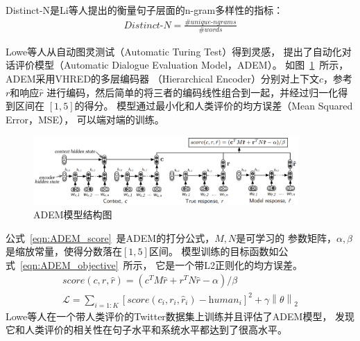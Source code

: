 Distinct-N是Li等人提出的衡量句子层面的n-gram多样性的指标：
\begin{align}
    \textit{Distinct-N} = \frac{\#\textit{unique-ngrams}}{\#\textit{words}}
\end{align}

Lowe等人从自动图灵测试（Automatic Turing Test）得到灵感，
提出了自动化对话评价模型（Automatic Dialogue Evaluation Model，ADEM）。
如图~\ref{fig:ADEM_model}~所示，ADEM采用VHRED的多层编码器
（Hierarchical Encoder）分别对上下文$c$，参考$r$和响应$\hat{r}$
进行编码，然后简单的将三者的编码线性组合到一起，并经过归一化得到区间在
$[1, 5]$的得分。
模型通过最小化和人类评价的均方误差（Mean Squared Error，MSE），
可以端对端的训练。
\begin{figure}[H]
    \centering
    \includegraphics[width=0.9\textwidth]{figure/ADEM.pdf}
    \caption{ADEM模型结构图}
    \label{fig:ADEM_model}
\end{figure}

公式~\ref{eqn:ADEM_score}~是ADEM的打分公式，$M, N$是可学习的
参数矩阵，$\alpha, \beta$是缩放常量，使得分数落在$[1, 5]$区间。
模型训练的目标函数如公式~\ref{eqn:ADEM_objective}~所示，
它是一个带L2正则化的均方误差。
\begin{align}
    \textit{score}(c, r, \hat{r}) = (c^T M \hat{r} + r^T N \hat{r} - \alpha) / \beta
    \label{eqn:ADEM_score} \\
    \mathcal{L} = \sum_{i=1:K} [\textit{score}(c_i, r_i, \hat{r}_i) - \textit{human}_i]^2 + \gamma \left\| \theta \right\| _2
    \label{eqn:ADEM_objective}
\end{align}
Lowe等人在一个带人类评价的Twitter数据集上训练并且评估了ADEM模型，
发现它和人类评价的相关性在句子水平和系统水平都达到了很高水平。

